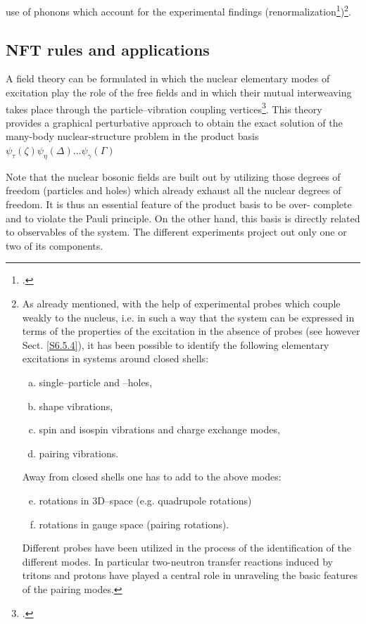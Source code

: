 use of phonons which account for the experimental findings (renormalization\footnote{\cite{Idini:15,Broglia:16,Barranco:17}.})\footnote{As already mentioned, with the help of experimental probes which couple weakly to the nucleus,
i.e. in such a way that the system can be expressed in terms of the properties
of the excitation in the absence of probes (see however Sect. \ref{S6.5.4}), it has been possible to identify the
following elementary excitations in systems around closed shells:
\begin{enumerate}[a)]
\item single--particle and --holes,
\item shape vibrations,
\item spin and isospin vibrations and charge exchange modes,
\item pairing vibrations.
\end{enumerate}
Away from closed shells one has to add to the above modes:
\begin{enumerate}[a)]
\setcounter{enumi}{4}
\item rotations in 3D--space (e.g. quadrupole rotations)
\item rotations in gauge space (pairing rotations).
\end{enumerate}
Different probes have been utilized in the process of the identification of the different modes. In particular two-neutron transfer reactions induced by tritons
and protons have played a central role in unraveling the basic features of the pairing modes.}.




 
\subsection{NFT rules and applications}\label{Sect1.7.2}
A field theory can be formulated in which the nuclear elementary modes of
excitation play the role of the free fields and in which their mutual interweaving takes place through the particle--vibration coupling vertices\footnote{\cite{Bes:74,Broglia:76,Bohr:75,Mottelson:76}.}.
This theory provides a graphical perturbative approach to obtain the exact
solution of the many-body nuclear-structure problem in the product basis $\psi_\tau(\zeta)\psi_\eta(\Delta)\dots\psi_\gamma(\Gamma)$


Note that the nuclear bosonic fields are built out by utilizing those degrees
of freedom (particles and holes) which already exhaust all the nuclear degrees
of freedom. It is thus an essential feature of the product basis to be over-
complete and to violate the Pauli principle. On the other hand, this basis is
directly related to observables of the system. The different experiments project out only one or two of its components.


